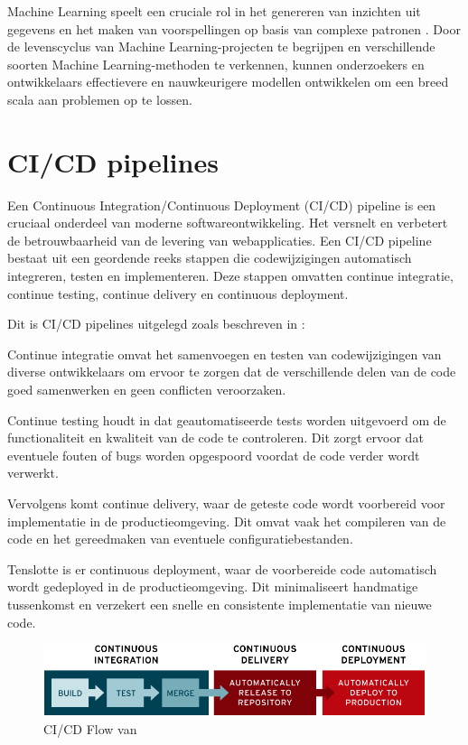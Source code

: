Machine Learning speelt een cruciale rol in het genereren van inzichten uit gegevens en het maken van voorspellingen op basis van complexe patronen \autocite{Jordan2015}. Door de levenscyclus van Machine Learning-projecten te begrijpen en verschillende soorten Machine Learning-methoden te verkennen, kunnen onderzoekers en ontwikkelaars effectievere en nauwkeurigere modellen ontwikkelen om een breed scala aan problemen op te lossen.
\section{CI/CD pipelines}

Een Continuous Integration/Continuous Deployment (CI/CD) pipeline is een cruciaal onderdeel van moderne softwareontwikkeling. Het versnelt en verbetert de betrouwbaarheid van de levering van webapplicaties. Een CI/CD pipeline bestaat uit een geordende reeks stappen die codewijzigingen automatisch integreren, testen en implementeren. Deze stappen omvatten continue integratie, continue testing, continue delivery en continuous deployment.

Dit is CI/CD pipelines uitgelegd zoals beschreven in \textcite{NaveenVemuri2024}:

Continue integratie omvat het samenvoegen en testen van codewijzigingen van diverse ontwikkelaars om ervoor te zorgen dat de verschillende delen van de code goed samenwerken en geen conflicten veroorzaken.

Continue testing houdt in dat geautomatiseerde tests worden uitgevoerd om de functionaliteit en kwaliteit van de code te controleren. Dit zorgt ervoor dat eventuele fouten of bugs worden opgespoord voordat de code verder wordt verwerkt.

Vervolgens komt continue delivery, waar de geteste code wordt voorbereid voor implementatie in de productieomgeving. Dit omvat vaak het compileren van de code en het gereedmaken van eventuele configuratiebestanden.

Tenslotte is er continuous deployment, waar de voorbereide code automatisch wordt gedeployed in de productieomgeving. Dit minimaliseert handmatige tussenkomst en verzekert een snelle en consistente implementatie van nieuwe code.\newline

\begin{figure}[h]
    \includegraphics[width=\linewidth]{cdci.png}
    \caption{CI/CD Flow van \autocite{RedHat2023}}
    \label{fig:CICD_flow}
\end{figure}
  
